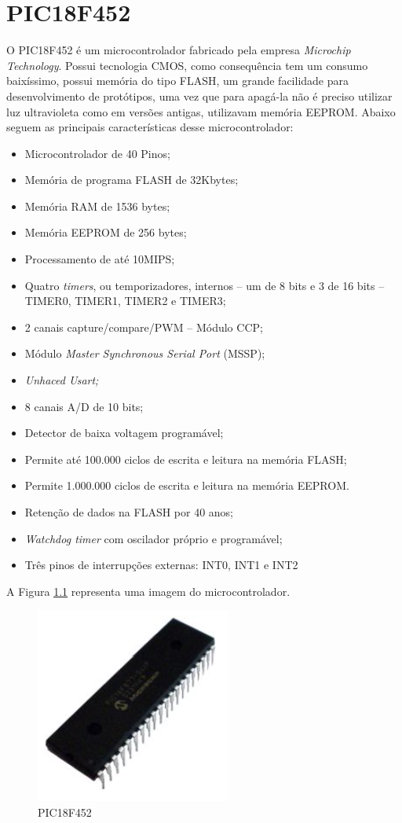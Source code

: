 \chapter{PIC18F452}
O PIC18F452 é um microcontrolador fabricado pela empresa \emph{Microchip Technology}. Possui tecnologia CMOS, como consequência tem um consumo baixíssimo, possui memória do tipo FLASH, um grande facilidade para desenvolvimento de protótipos, uma vez que para apagá-la não é preciso utilizar luz ultravioleta como em versões antigas, utilizavam memória EEPROM. Abaixo seguem as principais características desse microcontrolador:

\begin{itemize}
\item Microcontrolador de 40 Pinos;
\item Memória de programa FLASH de 32Kbytes;
\item Memória RAM de 1536 bytes;
\item Memória EEPROM de 256 bytes;
\item Processamento de até 10MIPS;
\item Quatro \emph{timers}, ou temporizadores, internos – um de 8 bits e 3 de 16 bits – TIMER0, TIMER1, TIMER2 e TIMER3;
\item 2 canais capture/compare/PWM – Módulo CCP;
\item Módulo \emph{Master Synchronous Serial Port} (MSSP);
\item \emph{Unhaced Usart;}
\item 8 canais A/D de 10 bits;
\item Detector de baixa voltagem programável;
\item Permite até 100.000 ciclos de escrita e leitura na memória FLASH;
\item Permite 1.000.000 ciclos de escrita e leitura na memória EEPROM.
\item Retenção de dados na FLASH por 40 anos;
\item \emph{Watchdog timer} com oscilador próprio e programável;
\item Três pinos de interrupções externas: INT0, INT1 e INT2
\end{itemize}

A Figura \ref{fig:pic} representa uma imagem do microcontrolador.

\begin{figure}[htp]
	\centering
	\includegraphics[scale=1]{images/pic.png}
	\caption{PIC18F452}	
	\label{fig:pic}	
\end{figure}

